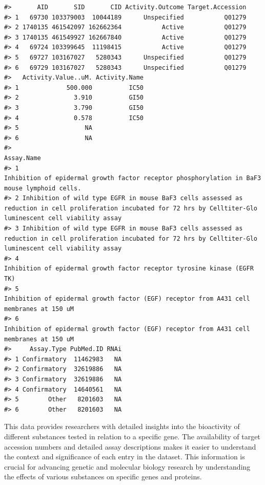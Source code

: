 \begin{verbatim}
#>       AID       SID       CID Activity.Outcome Target.Accession
#> 1   69730 103379003  10044189      Unspecified           Q01279
#> 2 1740135 461542097 162662364           Active           Q01279
#> 3 1740135 461549927 162667840           Active           Q01279
#> 4   69724 103399645  11198415           Active           Q01279
#> 5   69727 103167027   5280343      Unspecified           Q01279
#> 6   69729 103167027   5280343      Unspecified           Q01279
#>   Activity.Value..uM. Activity.Name
#> 1             500.000          IC50
#> 2               3.910          GI50
#> 3               3.790          GI50
#> 4               0.578          IC50
#> 5                  NA              
#> 6                  NA              
#>                                                                                                                                                            Assay.Name
#> 1                                                                        Inhibition of epidermal growth factor receptor phosphorylation in BaF3 mouse lymphoid cells.
#> 2 Inhibition of wild type EGFR in mouse BaF3 cells assessed as reduction in cell proliferation incubated for 72 hrs by Celltiter-Glo luminescent cell viability assay
#> 3 Inhibition of wild type EGFR in mouse BaF3 cells assessed as reduction in cell proliferation incubated for 72 hrs by Celltiter-Glo luminescent cell viability assay
#> 4                                                                                            Inhibition of epidermal growth factor receptor tyrosine kinase (EGFR TK)
#> 5                                                                             Inhibition of epidermal growth factor (EGF) receptor from A431 cell membranes at 150 uM
#> 6                                                                             Inhibition of epidermal growth factor (EGF) receptor from A431 cell membranes at 150 uM
#>     Assay.Type PubMed.ID RNAi
#> 1 Confirmatory  11462983   NA
#> 2 Confirmatory  32619886   NA
#> 3 Confirmatory  32619886   NA
#> 4 Confirmatory  14640561   NA
#> 5        Other   8201603   NA
#> 6        Other   8201603   NA
\end{verbatim}

This data provides researchers with detailed insights into the bioactivity of different substances tested in relation to a specific gene. The availability of target accession numbers and detailed assay descriptions makes it easier to understand the context and significance of each entry in the dataset. This information is crucial for advancing genetic and molecular biology research by understanding the effects of various substances on specific genes and proteins.

